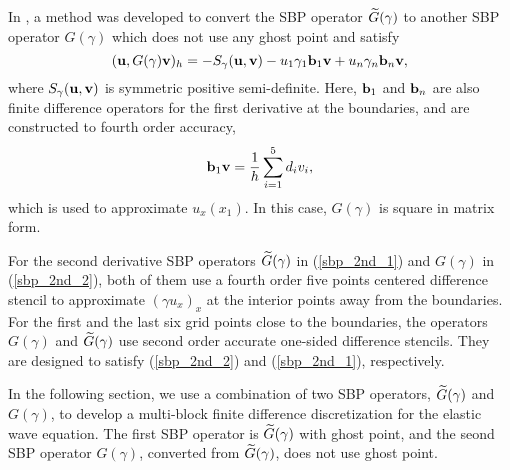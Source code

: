  In \cite{wang2018fourth}, a method was developed to convert the SBP operator $\widetilde{G}(\gamma)$ to another SBP operator $G(\gamma)$ which does not use any ghost point and satisfy
 \begin{equation}\label{sbp_2nd_2}
 ({\bf u}, G(\gamma){\bf v})_h = -S_\gamma({\bf u},{\bf v})-u_1\gamma_1{\bf b}_1{\bf v} + u_n\gamma_n{\bf b}_n{\bf v},
 \end{equation}
 where $S_\gamma({\bf u},{\bf v})$ is symmetric positive semi-definite. 
 Here, ${\bf b}_1$ and ${\bf b}_n$ are also finite difference operators for the first derivative at the boundaries, and are constructed to fourth order accuracy,
 \begin{equation}\label{sbp_1st_2}
 {\bf b}_1 {\bf v} = \frac{1}{h}\sum_{i=1}^{5} d_i v_i,
 \end{equation}
 which is used to approximate $u_x(x_1)$. In this case, ${G}(\gamma)$ is square in matrix form.%
 
For the second derivative SBP operators $\widetilde{G}(\gamma)$ in (\ref{sbp_2nd_1}) and $G(\gamma)$ in (\ref{sbp_2nd_2}), both of them use a fourth order five points centered difference stencil to approximate $(\gamma u_x)_x$ at the interior points away from the boundaries. For the first and the last six grid points close to the boundaries, the operators $G(\gamma)$ and $\widetilde{G}(\gamma)$ use second order accurate one-sided difference stencils. They are designed to satisfy (\ref{sbp_2nd_2}) and (\ref{sbp_2nd_1}), respectively.

In the following section, we use a combination of two SBP operators, $\widetilde{G}(\gamma)$ and $G(\gamma)$, to develop a multi-block finite difference discretization for the elastic wave equation. The first SBP operator is $\widetilde{G}(\gamma)$ with ghost point, and the seond SBP operator $G(\gamma)$, converted from $\widetilde{G}(\gamma)$, does not use ghost point.

